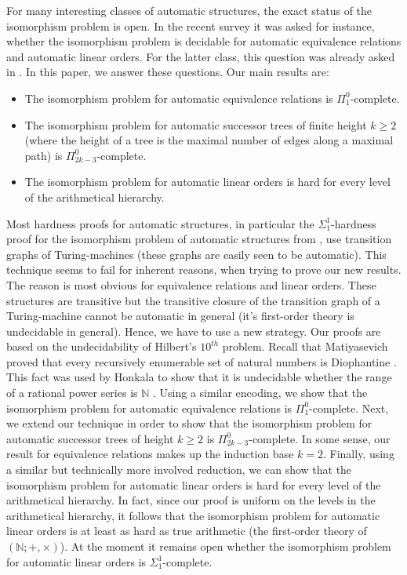 \documentclass[envcountsame]{llncs}
\begin{document}
For many interesting classes of automatic structures, the exact status of the isomorphism problem
is open. In the recent survey \cite{Rub08} it was asked for instance, whether
the isomorphism problem is decidable for automatic equivalence relations and
automatic linear orders.
For the latter class, this question was already asked in \cite{KhoRS05}.
In this paper, we answer these questions.
Our main results are:
\begin{itemize}
\item The isomorphism problem for  automatic equivalence relations
is $\Pi^0_1$-complete.
\item The isomorphism problem for automatic successor trees of finite height
$k \geq 2$ (where the height of a tree is the maximal number of edges along
a maximal path) is $\Pi^0_{2k-3}$-complete.
\item The isomorphism problem for automatic linear orders is
hard for every level of the arithmetical hierarchy.
\end{itemize}
Most hardness proofs for automatic structures, in particular the
$\Sigma^1_1$-hardness proof for the isomorphism problem of automatic
structures from \cite{KhoNRS07}, use transition graphs of
Turing-machines (these graphs are easily seen to be automatic). This
technique seems to fail for inherent reasons, when trying to prove our
new results. The reason is most obvious for equivalence relations and
linear orders. These structures are transitive but the transitive
closure of the transition graph of a Turing-machine cannot be
automatic in general (it's first-order theory is undecidable in
general). Hence, we have to use a new strategy. Our proofs are based
on the undecidability of Hilbert's $10^{th}$ problem. Recall that
Matiyasevich proved that every recursively enumerable set of natural
numbers is Diophantine \cite{Mat93}. This fact was used by Honkala to
show that it is undecidable whether the range of a rational power
series is $\mathbb{N}$ \cite{Hon06}.  Using a similar encoding, we
show that the isomorphism problem for automatic equivalence relations
is $\Pi^0_1$-complete. Next, we extend our technique in order to show
that the isomorphism problem for automatic successor trees of height
$k \geq 2$ is $\Pi^0_{2k-3}$-complete. In some sense, our result
for equivalence relations makes up the induction base $k=2$.
Finally, using a similar but
technically more involved reduction, we can show that the isomorphism
problem for automatic linear orders is hard for every level of the
arithmetical hierarchy. In fact, since our proof is uniform on the
levels in the arithmetical hierarchy, it follows that
the isomorphism problem for automatic linear orders is at least
as hard as true arithmetic (the first-order theory of
$(\mathbb{N};+,\times)$).  
At the moment it remains open whether the isomorphism problem for
automatic linear orders is $\Sigma^1_1$-complete.
\end{document}
